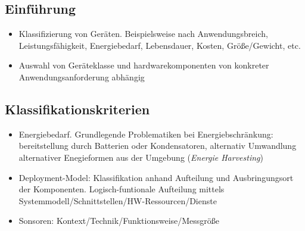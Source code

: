 \subsection{Einführung}
\begin{itemize}
	\item Klassifizierung von Geräten. Beispielsweise nach Anwendungsbreich, Leistungsfähigkeit, Energiebedarf, Lebensdauer, Kosten, Größe/Gewicht, etc.
	\item Auswahl von Geräteklasse und hardwarekomponenten von konkreter Anwendungsanforderung abhängig
\end{itemize}


\subsection{Klassifikationskriterien}
\begin{itemize}
	\item Energiebedarf. Grundlegende Problematiken bei Energiebschränkung: bereitstellung durch Batterien oder Kondensatoren, alternativ Umwandlung alternativer Enegieformen aus der Umgebung (\textit{Energie Harvesting})
	\item Deployment-Model: Klassifikation anhand Aufteilung und Ausbringungsort der Komponenten. Logisch-funtionale Aufteilung mittels Systemmodell/Schnittstellen/HW-Ressourcen/Dienste
	\item Sonsoren: Kontext/Technik/Funktionsweise/Messgröße
\end{itemize}


